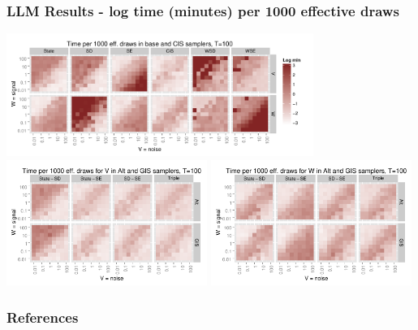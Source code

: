 \documentclass[xcolor=dvipsnames]{beamer}
\begin{document}
\begin{frame}
\frametitle{LLM Results - log time (minutes) per 1000 effective draws}
\centering
\includegraphics[width=0.75\textwidth]{basecistimeplot100}\\
\includegraphics[width=0.49\textwidth]{altgisVtimeplot100}
\includegraphics[width=0.49\textwidth]{altgisWtimeplot100}
\end{frame}

\begin{frame}[allowframebreaks]
        \frametitle{References}
        
        
\end{frame} 
\end{document}

